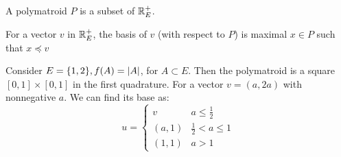 \documentclass{article}
\begin{document}
A polymatroid $P$ is a subset of $\mathbb{R}_E^+$.

For a vector $v$ in $\mathbb{R}_E^+$,  the basis of $v$ (with respect to $P$) is maximal $x\in P$ such that $ x \preceq v$

Consider $E=\{1,2\}, f(A) = \lvert A\rvert$, for $A\subset E$. Then the polymatroid is a square $[0,1]\times [0,1]$ in the first quadrature. For a vector $v=(a,2a)$ with nonnegative $a$. We can find its base as:
\begin{equation}
u =\begin{cases}
v & a \leq \frac{1}{2} \\
(a, 1) & \frac{1}{2} < a \leq 1 \\
(1,1) & a > 1
\end{cases}
\end{equation}
\end{document}
